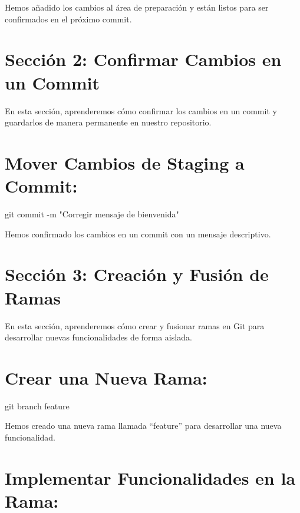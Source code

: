 \documentclass[
  a4paper,
  DIV=11,
  numbers=noendperiod,
  onepage,
  openany]{scrreprt}
\newenvironment{Shaded}{\begin{snugshade}}{\end{snugshade}}
\newcommand{\AttributeTok}[1]{\textcolor[rgb]{0.40,0.45,0.13}{#1}}
\newcommand{\FunctionTok}[1]{\textcolor[rgb]{0.28,0.35,0.67}{#1}}
\newcommand{\NormalTok}[1]{\textcolor[rgb]{0.00,0.23,0.31}{#1}}
\newcommand{\StringTok}[1]{\textcolor[rgb]{0.13,0.47,0.30}{#1}}
\begin{document}
Hemos añadido los cambios al área de preparación y están listos para ser
confirmados en el próximo commit.

\section{Sección 2: Confirmar Cambios en un
Commit}\label{secciuxf3n-2-confirmar-cambios-en-un-commit}

En esta sección, aprenderemos cómo confirmar los cambios en un commit y
guardarlos de manera permanente en nuestro repositorio.

\section{Mover Cambios de Staging a
Commit:}\label{mover-cambios-de-staging-a-commit}

\begin{Shaded}
\begin{Highlighting}[]
\FunctionTok{git}\NormalTok{ commit }\AttributeTok{{-}m} \StringTok{"Corregir mensaje de bienvenida"}
\end{Highlighting}
\end{Shaded}

Hemos confirmado los cambios en un commit con un mensaje descriptivo.

\section{Sección 3: Creación y Fusión de
Ramas}\label{secciuxf3n-3-creaciuxf3n-y-fusiuxf3n-de-ramas}

En esta sección, aprenderemos cómo crear y fusionar ramas en Git para
desarrollar nuevas funcionalidades de forma aislada.

\section{Crear una Nueva Rama:}\label{crear-una-nueva-rama}

\begin{Shaded}
\begin{Highlighting}[]
\FunctionTok{git}\NormalTok{ branch feature}
\end{Highlighting}
\end{Shaded}

Hemos creado una nueva rama llamada ``feature'' para desarrollar una
nueva funcionalidad.

\section{Implementar Funcionalidades en la
Rama:}\label{implementar-funcionalidades-en-la-rama}
\end{document}

